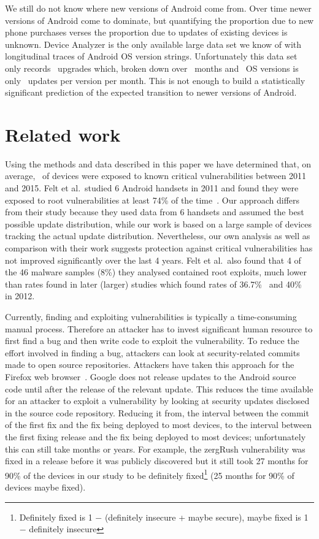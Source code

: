 \documentclass{llncs}
\begin{document}
We still do not know where new versions of Android come from.
Over time newer versions of Android come to dominate, but quantifying the proportion due to new phone purchases verses the proportion due to updates of existing devices is unknown.
Device Analyzer is the only available large data set we know of with longitudinal traces of Android OS version strings.
Unfortunately this data set only records \daNumUpdatesUpgrades\ upgrades which, broken down over \daOSMonthsOfData\ months and \daNumSigOSVersions\ OS versions is only \daUpdatesPerMonthPerVersion\ updates per version per month. This is not enough to build a statistically significant prediction of the expected transition to newer versions of Android.
 
\section{Related work}
\label{sec:related}
Using the methods and data described in this paper we have determined that, on average, \daMeanInsecurityPerc\ of devices were exposed to known critical vulnerabilities between 2011 and 2015.
Felt et al.\ studied 6 Android handsets in 2011 and found they were exposed to root vulnerabilities at least 74\% of the time~\cite{Felt2011}.
Our approach differs from their study because they used data from 6 handsets and assumed the best possible update distribution, while our work is based on a large sample of devices tracking the actual update distribution.
Nevertheless, our own analysis as well as comparison with their work suggests protection against critical vulnerabilities has not improved significantly over the last 4 years. 
Felt et al.\ also found that 4 of the 46 malware samples (8\%) they analysed contained root exploits, much lower than rates found in later (larger) studies which found rates of 36.7\%~\cite{Zhou2012b} and 40\%~\cite{Zhou2012a} in 2012.

Currently, finding and exploiting vulnerabilities is typically a time-consuming manual process.
Therefore an attacker has to invest significant human resource to first find a bug and then write code to exploit the vulnerability.
To reduce the effort involved in finding a bug, attackers can look at security-related commits made to open source repositories.
Attackers have taken this approach for the Firefox web browser~\cite{Barth2011}.
Google does not release updates to the Android source code until after the release of the relevant update.
This reduces the time available for an attacker to exploit a vulnerability by looking at security updates disclosed in the source code repository.
Reducing it from, the interval between the commit of the first fix and the fix being deployed to most devices, to the interval between the first fixing release and the fix being deployed to most devices; unfortunately this can still take months or years.
For example, the zergRush vulnerability was fixed in a release before it was publicly discovered but it still took 27 months for 90\% of the devices in our study to be definitely fixed\footnote{Definitely fixed is 1 $-$ (definitely insecure + maybe secure), maybe fixed is 1 $-$ definitely insecure} (25 months for 90\% of devices maybe fixed).
\end{document}
